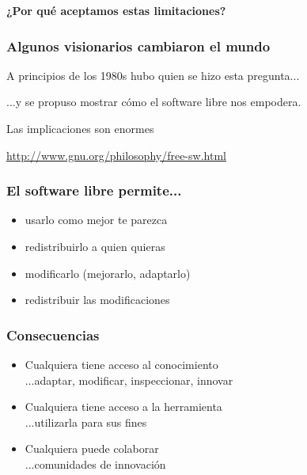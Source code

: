 \documentclass[17pt,aspectratio=169]{beamer}
\begin{document}

\begin{frame}

\begin{center}
\textbf{\Huge ¿Por qué aceptamos estas limitaciones?}
\end{center}
\end{frame}


\begin{frame}
\frametitle{Algunos visionarios cambiaron el mundo}

A principios de los 1980s hubo quien se hizo esta pregunta...

\vspace{.1cm}

...y se propuso mostrar cómo el software libre nos empodera.

\vspace{.1cm}

Las implicaciones son enormes

\begin{flushright}
{\small \url{http://www.gnu.org/philosophy/free-sw.html}}
\end{flushright}
\end{frame}


\begin{frame}
\frametitle{El software libre permite...}

{\large
\begin{itemize}
\item usarlo como mejor te parezca
\item redistribuirlo a quien quieras
\item modificarlo (mejorarlo, adaptarlo)
\item redistribuir las modificaciones
\end{itemize}
}
\end{frame}


\begin{frame}
\frametitle{Consecuencias}

\begin{itemize}
\item Cualquiera tiene acceso al conocimiento \\
  ...adaptar, modificar, inspeccionar, innovar
\item Cualquiera tiene acceso a la herramienta \\
  ...utilizarla para sus fines
\item Cualquiera puede colaborar \\
  ...comunidades de innovación
\end{itemize}

\end{frame}
\end{document}
